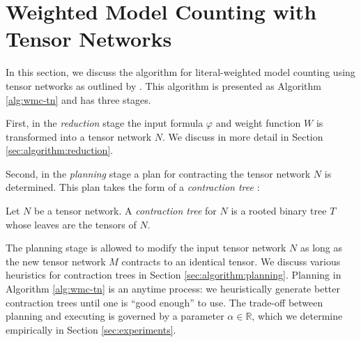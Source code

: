 \section{Weighted Model Counting with Tensor Networks}
\label{sec:algorithm}
In this section, we discuss the algorithm for literal-weighted model counting using tensor networks as outlined by \cite{DDV19}. This algorithm is presented as Algorithm \ref{alg:wmc-tn} and has three stages.

First, in the \emph{reduction} stage the input formula $\varphi$ and weight function $W$ is transformed into a tensor network $N$. We discuss in more detail in Section \ref{sec:algorithm:reduction}.

Second, in the \emph{planning} stage a plan for contracting the tensor network $N$ is determined. This plan takes the form of a \emph{contraction tree} \cite{EP14}:
\begin{definition} \label{def:contraction-tree}
	Let $N$ be a tensor network. A \emph{contraction tree} for $N$ is a rooted binary tree $T$ whose leaves are the tensors of $N$. %
\end{definition}
The planning stage is allowed to modify the input tensor network $N$ as long as the new tensor network $M$ contracts to an identical tensor. We discuss various heuristics for contraction trees in Section \ref{sec:algorithm:planning}.
Planning in Algorithm \ref{alg:wmc-tn} is an anytime process: we heuristically generate better contraction trees until one is ``good enough'' to use. The trade-off between planning and executing is governed by a parameter $\alpha \in \mathbb{R}$, which we determine empirically in Section \ref{sec:experiments}. 



